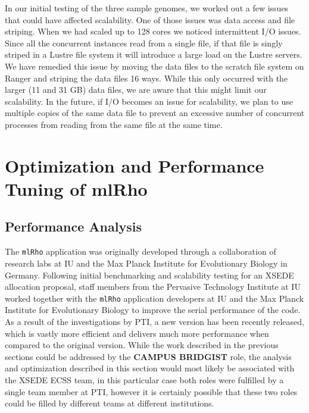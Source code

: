 \documentclass{sig-alternate}
\begin{document}
In our initial testing of the three sample genomes, we worked out a few issues that could have affected
scalability. One of those issues was data access and file striping. When we had scaled up to 128 cores we
noticed intermittent I/O issues. Since all the concurrent instances read from a single file, if that file is
singly striped in a Lustre file system it will introduce a large load on the Lustre servers. We have remedied
this issue by moving the data files to the scratch file system on Ranger and striping the data files 16
ways. While this only occurred with the larger (11 and 31 GB) data files, we are aware that this might limit
our scalability. In the future, if I/O becomes an issue for scalability, we plan to use multiple copies of the
same data file to prevent an excessive number of concurrent processes from reading from the same file at the same time.

\section{Optimization and Performance Tuning of mlRho}\label{sec:optimization}
\subsection{Performance Analysis}\label{subsec:analysis}
The \texttt{mlRho} application was originally developed through a collaboration of research labs at IU and the
Max Planck Institute for Evolutionary Biology in Germany. Following initial benchmarking and scalability
testing for an XSEDE allocation proposal, staff members from the Pervasive Technology Institute at IU worked
together with the \texttt{mlRho} application developers at IU and the Max Planck Institute for Evolutionary
Biology to improve the serial performance of the code. As a result of the investigations by PTI, a new version
has been recently released, which is vastly more efficient and delivers much more performance when compared to
the original version. While the work described in the previous sections could be addressed by the {\bf CAMPUS
  BRIDGIST} role, the analysis and optimization described in this section would most likely be associated with
the XSEDE ECSS team, in this particular case both roles were fulfilled by a single team member at PTI, however
it is certainly possible that these two roles could be filled by different teams at different institutions.
\end{document}
